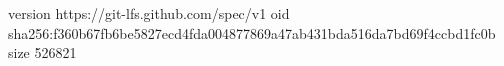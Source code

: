 version https://git-lfs.github.com/spec/v1
oid sha256:f360b67fb6be5827ecd4fda004877869a47ab431bda516da7bd69f4ccbd1fc0b
size 526821
